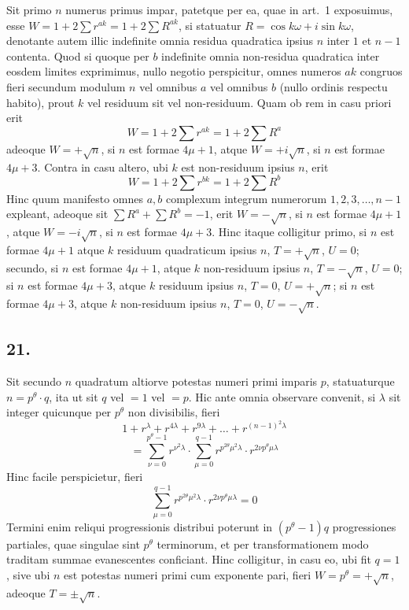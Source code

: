 \documentclass[12pt,a4paper]{article}
\theoremstyle{plain}
\begin{document}
Sit primo $n$ numerus primus impar, patetque per ea, quae in art.\ 1 exposuimus, esse $W = 1 + 2\sum r^{ak} = 1 + 2\sum R^{ak}$, si statuatur $R = \cos k\omega + i \sin k\omega$, denotante autem illic indefinite omnia residua quadratica ipsius $n$ inter $1$ et $n-1$ contenta. Quod si quoque per $b$ indefinite omnia non-residua quadratica inter eosdem limites exprimimus, nullo negotio perspicitur, omnes numeros $ak$ congruos fieri secundum modulum $n$ vel omnibus $a$ vel omnibus $b$ (nullo ordinis respectu habito), prout $k$ vel residuum sit vel non-residuum. Quam ob rem in casu priori erit
\[
W = 1 + 2\sum r^{ak} = 1 + 2\sum R^{a}
\]
adeoque $W = +\sqrt{n}$, si $n$ est formae $4\mu+1$, atque $W = +i\sqrt{n}$, si $n$ est formae $4\mu+3$. Contra in casu altero, ubi $k$ est non-residuum ipsius $n$, erit
\[
W = 1 + 2\sum r^{bk} = 1 + 2\sum R^{b}
\]
Hinc quum manifesto omnes $a, b$ complexum integrum numerorum $1, 2, 3, \ldots, n-1$ expleant, adeoque sit $\sum R^{a} + \sum R^{b} = -1$, erit $W = -\sqrt{n}$, si $n$ est formae $4\mu+1$, atque $W = -i\sqrt{n}$, si $n$ est formae $4\mu+3$. Hinc itaque colligitur primo, si $n$ est formae $4\mu+1$ atque $k$ residuum quadraticum ipsius $n$, $T = +\sqrt{n}$, $U = 0$; secundo, si $n$ est formae $4\mu+1$, atque $k$ non-residuum ipsius $n$, $T = -\sqrt{n}$, $U = 0$; si $n$ est formae $4\mu+3$, atque $k$ residuum ipsius $n$, $T = 0$, $U = +\sqrt{n}$; si $n$ est formae $4\mu+3$, atque $k$ non-residuum ipsius $n$, $T = 0$, $U = -\sqrt{n}$.

\subsection*{21.}

Sit secundo $n$ quadratum altiorve potestas numeri primi imparis $p$, statuaturque $n = p^{\theta} \cdot q$, ita ut sit $q$ vel $= 1$ vel $= p$. Hic ante omnia observare convenit, si $\lambda$ sit integer quicunque per $p^{\theta}$ non divisibilis, fieri
\[
1 + r^{\lambda} + r^{4\lambda} + r^{9\lambda} + \ldots + r^{(n-1)^2 \lambda}
\]
\[
= \sum_{\nu=0}^{p^{\theta}-1} r^{\nu^2 \lambda} \cdot \sum_{\mu=0}^{q-1} r^{p^{2\theta} \mu^2 \lambda} \cdot r^{2\nu p^{\theta} \mu \lambda}
\]
Hinc facile perspicietur, fieri
\[
\sum_{\mu=0}^{q-1} r^{p^{2\theta} \mu^2 \lambda} \cdot r^{2\nu p^{\theta} \mu \lambda} = 0
\]
Termini enim reliqui progressionis distribui poterunt in $(p^{\theta}-1)q$ progressiones partiales, quae singulae sint $p^{\theta}$ terminorum, et per transformationem modo traditam summae evanescentes conficiant. Hinc colligitur, in casu eo, ubi fit $q = 1$, sive ubi $n$ est potestas numeri primi cum exponente pari, fieri $W = p^{\theta} = +\sqrt{n}$, adeoque $T = \pm\sqrt{n}$.
\end{document}
